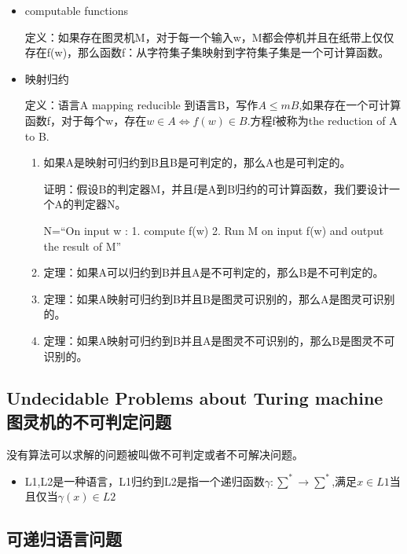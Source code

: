 \documentclass[UTF8]{ctexart}
\begin{document}
\begin{itemize}
    \item computable functions
    
    定义：如果存在图灵机M，对于每一个输入w，M都会停机并且在纸带上仅仅存在f(w)，那么函数f：从字符集子集映射到字符集子集是一个可计算函数。

    \item 映射归约
    
    定义：语言A mapping reducible 到语言B，写作$A\leqslant m B$,如果存在一个可计算函数f，对于每个w，存在$w \in A \Leftrightarrow f(w) \in B$.方程f被称为the reduction of A to B.

    \begin{enumerate}
        \item 如果A是映射可归约到B且B是可判定的，那么A也是可判定的。
        
        证明：假设B的判定器M，并且f是A到B归约的可计算函数，我们要设计一个A的判定器N。

        N=“On input w : 1. compute f(w) 2. Run M on input f(w) and output the result of M”

        \item 定理：如果A可以归约到B并且A是不可判定的，那么B是不可判定的。
        \item 定理：如果A映射可归约到B并且B是图灵可识别的，那么A是图灵可识别的。
        \item 定理：如果A映射可归约到B并且A是图灵不可识别的，那么B是图灵不可识别的。
        

    \end{enumerate}
    
\end{itemize}

\subsection{Undecidable Problems about Turing machine 图灵机的不可判定问题}

没有算法可以求解的问题被叫做不可判定或者不可解决问题。

\begin{itemize}
    \item L1,L2是一种语言，L1归约到L2是指一个递归函数$\gamma:\sum^{*}\rightarrow \sum^{*}$,满足$x \in L1$当且仅当$\gamma(x) \in L2$
\end{itemize}


\subsection{可递归语言问题}
\end{document}
